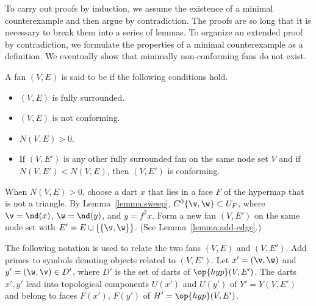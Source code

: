 To carry out proofs by induction, we assume the existence of a minimal
counterexample and then argue by contradiction.  The proofs are so
long that it is necessary to break them into a series of lemmas.  To
organize an extended proof by contradiction, we formulate the
properties of a minimal counterexample as a definition.  We eventually
show that minimally non-conforming fans do not exist.

\begin{definition}
A fan $(V,E)$ is said to be  if
the following conditions hold.
\begin{itemize}
\item $(V,E)$ is fully surrounded.
\item $(V,E)$ is not conforming.
\item $N(V,E)>0$.
\item If $(V,E')$ is any other fully surrounded fan on the same node
set $V$ and if $N(V,E') < N(V,E)$, then $(V,E')$ is conforming.
\end{itemize}
\end{definition}
%



\begin{remark}\label{remark:reduction}
  When $N(V,E)>0$, choose a dart $x$ that lies in a face $F$ of the
  hypermap that is not a triangle.  By Lemma~\ref{lemma:sweep},
  $C^0\{\v,\w\}\subset U_F$, where $\v=\nd(x)$, $\w=\nd(y)$, and
  $y=f^2 x$.  Form a new fan $(V,E')$ on the same node set with $E' =
  E\cup \{\{\v,\w\}\}$.  (See Lemma~\ref{lemma:add-edge}.)

The following notation is used to relate the two fans $(V,E)$ and $(V,E')$.  
Add primes to symbols
denoting objects related to $(V,E')$.
Let $x'=(\v,\w)$ and $y'=(\w,\v)\in D'$, where $D'$ is the set of darts of $\op{hyp}(V,E')$.
The darts $x',y'$ lead into topological components
$U(x')$ and $U(y')$ of $Y'=Y(V,E')$ and belong to faces $F(x')$,
$F(y')$ of $H'=\op{hyp}(V,E')$.
\end{remark}

